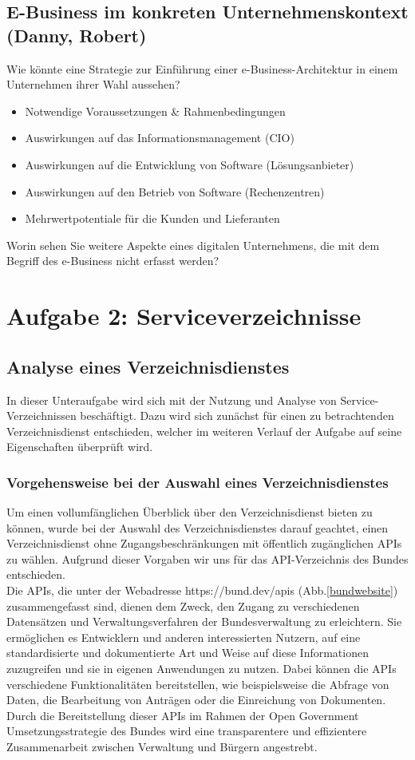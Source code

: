 \documentclass[notitlepage, hidelinks]{article}
\begin{document}
\subsection{E-Business im konkreten Unternehmenskontext (Danny, Robert)}
Wie könnte eine Strategie zur Einführung einer e-Business-Architektur in einem Unternehmen ihrer Wahl aussehen?
\begin{itemize}
\item Notwendige Voraussetzungen \& Rahmenbedingungen
\item Auswirkungen auf das Informationsmanagement (CIO)
\item Auswirkungen auf die Entwicklung von Software (Lösungsanbieter)
\item Auswirkungen auf den Betrieb von Software (Rechenzentren)
\item Mehrwertpotentiale für die Kunden und Lieferanten
\end{itemize}

Worin sehen Sie weitere Aspekte eines digitalen Unternehmens, die mit dem Begriff des e-Business nicht erfasst werden?

\newpage

\section{Aufgabe 2: Serviceverzeichnisse}
\subsection{Analyse eines Verzeichnisdienstes}

In dieser Unteraufgabe wird sich mit der Nutzung und Analyse von Service-Verzeichnissen beschäftigt. Dazu wird sich zunächst für einen zu betrachtenden Verzeichnisdienst entschieden, welcher im weiteren Verlauf der Aufgabe auf seine Eigenschaften überprüft wird.

\subsubsection{Vorgehensweise bei der Auswahl eines Verzeichnisdienstes}
Um einen vollumfänglichen Überblick über den Verzeichnisdienst bieten zu können, wurde bei der Auswahl des Verzeichnisdienstes darauf geachtet, einen Verzeichnisdienst ohne Zugangsbeschränkungen mit öffentlich zugänglichen APIs zu wählen. Aufgrund dieser Vorgaben wir uns für das API-Verzeichnis des Bundes entschieden. \\
Die APIs, die unter der Webadresse https://bund.dev/apis (Abb.\ref{bundwebsite}) zusammengefasst sind, dienen dem Zweck, den Zugang zu verschiedenen Datensätzen und Verwaltungsverfahren der Bundesverwaltung zu erleichtern. Sie ermöglichen es Entwicklern und anderen interessierten Nutzern, auf eine standardisierte und dokumentierte Art und Weise auf diese Informationen zuzugreifen und sie in eigenen Anwendungen zu nutzen. Dabei können die APIs verschiedene Funktionalitäten bereitstellen, wie beispielsweise die Abfrage von Daten, die Bearbeitung von Anträgen oder die Einreichung von Dokumenten. Durch die Bereitstellung dieser APIs im Rahmen der Open Government Umsetzungsstrategie des Bundes wird eine transparentere und effizientere Zusammenarbeit zwischen Verwaltung und Bürgern angestrebt. 
\end{document}
